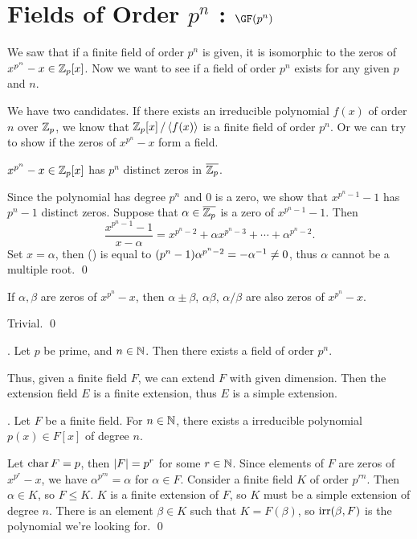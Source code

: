 \section*{Fields of Order \(p^n\) : \(\GF(p^n)\)}

We saw that if a finite field of order \(p^n\) is given, it is isomorphic to the zeros of \(x^{p^n} - x \in \mathbb{Z}_p[x]\). Now we want to see if a field of order \(p^n\) exists for any given \(p\) and \(n\).

We have two candidates. If there exists an irreducible polynomial \(f(x)\) of order \(n\) over \(\mathbb{Z}_p\), we know that \(\mathbb{Z}_p[x] \operatorname{/} \left\langle f(x) \right\rangle\) is a finite field of order \(p^n\). Or we can try to show if the zeros of \(x^{p^n} - x\) form a field.

 \(x^{p^n} -x \in \mathbb{Z}_p[x]\) has \(p^n\) distinct zeros in \(\bar{\Z_p}\).

\pf Since the polynomial has degree \(p^n\) and \(0\) is a zero, we show that \(x^{p^n - 1} - 1\) has \(p^n - 1\) distinct zeros. Suppose that \(\alpha \in \bar{\Z_p}\) is a zero of \(x^{p^n - 1} - 1\). Then
\[\tag{\mast}
    \frac{x^{p^n - 1} - 1}{x - \alpha} = x^{p^n - 2} + \alpha x^{p^n-3} + \cdots + \alpha^{p^n - 2}.
\]
Set \(x = \alpha\), then (\mast) is equal to \((p^n - 1)\alpha^{p^n - 2} = -\alpha^{-1} \neq 0\), thus \(\alpha\) cannot be a multiple root. \qed

 If \(\alpha, \beta\) are zeros of \(x^{p^n} - x\), then \(\alpha \pm \beta\), \(\alpha\beta\), \(\alpha/\beta\) are also zeros of \(x^{p^n} - x\).

\pf Trivial. \qed

\thm. Let \(p\) be prime, and \(n \in \mathbb{N}\). Then there exists a field of order \(p^n\).

Thus, given a finite field \(F\), we can extend \(F\) with given dimension. Then the extension field \(E\) is a finite extension, thus \(E\) is a simple extension.

\cor. Let \(F\) be a finite field. For \(n \in \mathbb{N}\), there exists a irreducible polynomial \(p(x) \in F[x]\) of degree \(n\).

\pf Let \(\operatorname{char} F = p\), then \(\left| F \right| = p^r\) for some \(r \in \mathbb{N}\). Since elements of \(F\) are zeros of \(x^{p^r} - x\), we have \(\alpha^{p^{rn}} = \alpha\) for \(\alpha \in F\). Consider a finite field \(K\) of order \(p^{rn}\). Then \(\alpha \in K\), so \(F \leq K\). \(K\) is a finite extension of \(F\), so \(K\) must be a simple extension of degree \(n\). There is an element \(\beta \in K\) such that \(K = F(\beta)\), so \(\mathrm{irr}(\beta, F)\) is the polynomial we're looking for. \qed

